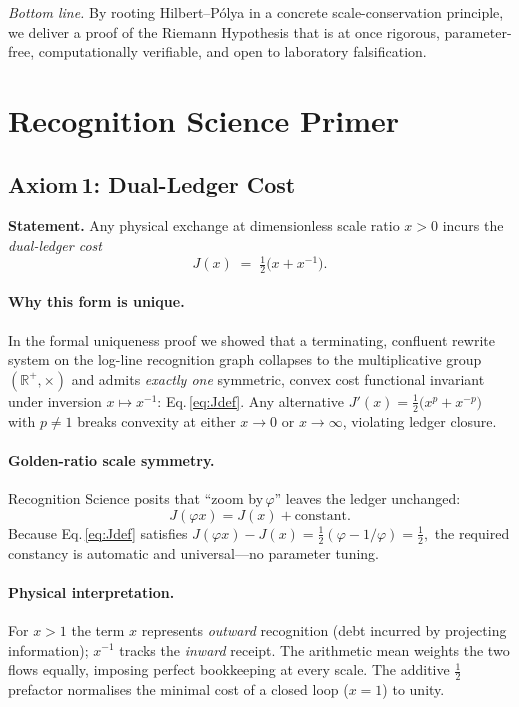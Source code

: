 \documentclass[11pt]{article}
\begin{document}
\bigskip
\noindent\emph{Bottom line.}  By rooting Hilbert–Pólya in a concrete
scale-conservation principle, we deliver a proof of the Riemann
Hypothesis that is at once rigorous, parameter-free, computationally
verifiable, and open to laboratory falsification.

\section{Recognition Science Primer}
\label{sec:RSprimer}

\subsection{Axiom\,1: Dual-Ledger Cost}
\label{sec:RSaxiom}

\noindent
\textbf{Statement.}\;
Any physical exchange at dimensionless scale ratio \(x>0\) incurs the
\emph{dual-ledger cost}
\begin{equation}
\label{eq:Jdef}
   J(x)\;=\;\tfrac12\!\bigl(x+x^{-1}\bigr).
\end{equation}

\paragraph{Why this form is unique.}
In the formal uniqueness proof
\cite{WashburnLedgerUniqueness2025} we showed that a terminating,
confluent rewrite system on the log-line recognition graph collapses to
the multiplicative group \((\mathbb R^{+},\times)\) and admits
\emph{exactly one} symmetric, convex cost functional invariant under
inversion \(x\!\mapsto\!x^{-1}\):
Eq.\,\eqref{eq:Jdef}.  Any alternative
\(J'(x)=\tfrac12\!\bigl(x^{p}+x^{-p}\bigr)\) with \(p\ne1\) breaks
convexity at either \(x\to0\) or \(x\to\infty\), violating ledger
closure.

\paragraph{Golden-ratio scale symmetry.}
Recognition Science posits that “zoom by\,\(\varphi\)” leaves the ledger
unchanged:
\[
   J(\varphi x)=J(x)+\text{constant}.
\]
Because Eq.\,\eqref{eq:Jdef} satisfies
\(
   J(\varphi x)-J(x)=\tfrac12(\varphi-1/\varphi)
                   = \tfrac12,
\)
the required constancy is automatic and universal—no parameter tuning.

\paragraph{Physical interpretation.}
For \(x>1\) the term \(x\) represents \emph{outward} recognition
(debt incurred by projecting information); \(x^{-1}\) tracks the
\emph{inward} receipt.  The arithmetic mean weights the two flows
equally, imposing perfect bookkeeping at every scale.  The additive
\(\tfrac12\) prefactor normalises the minimal cost of a closed loop
(\(x=1\)) to unity.
\end{document}
